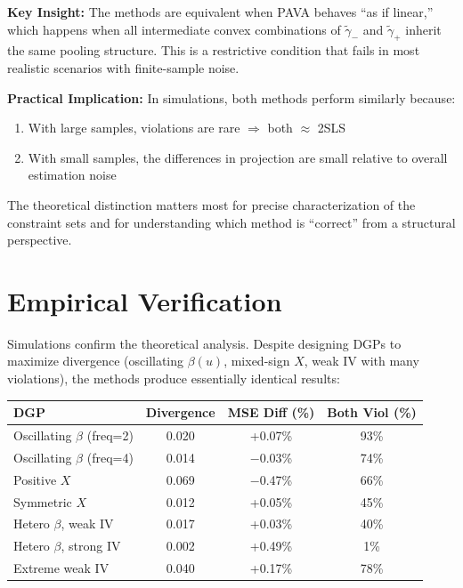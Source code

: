 \documentclass[12pt]{article}
\begin{document}
\textbf{Key Insight:} The methods are equivalent when PAVA behaves ``as if linear,'' which happens when all intermediate convex combinations of $\tilde{\gamma}_-$ and $\tilde{\gamma}_+$ inherit the same pooling structure. This is a restrictive condition that fails in most realistic scenarios with finite-sample noise.

\textbf{Practical Implication:} In simulations, both methods perform similarly because:
\begin{enumerate}
\item With large samples, violations are rare $\Rightarrow$ both $\approx$ 2SLS
\item With small samples, the differences in projection are small relative to overall estimation noise
\end{enumerate}

The theoretical distinction matters most for precise characterization of the constraint sets and for understanding which method is ``correct'' from a structural perspective.

\section{Empirical Verification}

Simulations confirm the theoretical analysis. Despite designing DGPs to maximize divergence (oscillating $\beta(u)$, mixed-sign $X$, weak IV with many violations), the methods produce essentially identical results:

\begin{center}
\begin{tabular}{|l|c|c|c|}
\hline
\textbf{DGP} & \textbf{Divergence} & \textbf{MSE Diff (\%)} & \textbf{Both Viol (\%)} \\
\hline
Oscillating $\beta$ (freq=2) & 0.020 & +0.07\% & 93\% \\
Oscillating $\beta$ (freq=4) & 0.014 & $-$0.03\% & 74\% \\
Positive $X$ & 0.069 & $-$0.47\% & 66\% \\
Symmetric $X$ & 0.012 & +0.05\% & 45\% \\
Hetero $\beta$, weak IV & 0.017 & +0.03\% & 40\% \\
Hetero $\beta$, strong IV & 0.002 & +0.49\% & 1\% \\
Extreme weak IV & 0.040 & +0.17\% & 78\% \\
\hline
\end{tabular}
\end{center}
\end{document}
